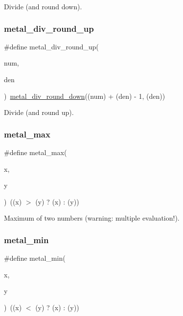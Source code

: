 Divide (and round down). \mbox{\label{group__utilities_gace231318276c47f6e2fbc12e61fd5b7c}} 
\subsubsection{\texorpdfstring{metal\+\_\+div\+\_\+round\+\_\+up}{metal\_div\_round\_up}}
{\footnotesize\ttfamily \#define metal\+\_\+div\+\_\+round\+\_\+up(\begin{DoxyParamCaption}\item[{}]{num,  }\item[{}]{den }\end{DoxyParamCaption})~\hyperlink{group__utilities_ga86077c41e1fb0d755b406d07213aecae}{metal\+\_\+div\+\_\+round\+\_\+down}((num) + (den) -\/ 1, (den))}

Divide (and round up). \mbox{\label{group__utilities_ga4e7658a6bfc47722c6dbf37b2b15278c}} 
\subsubsection{\texorpdfstring{metal\+\_\+max}{metal\_max}}
{\footnotesize\ttfamily \#define metal\+\_\+max(\begin{DoxyParamCaption}\item[{}]{x,  }\item[{}]{y }\end{DoxyParamCaption})~((x) $>$ (y) ? (x) \+: (y))}

Maximum of two numbers (warning\+: multiple evaluation!). \mbox{\label{group__utilities_ga9ea8974801fa4d6b7769097f5da5a68b}} 
\subsubsection{\texorpdfstring{metal\+\_\+min}{metal\_min}}
{\footnotesize\ttfamily \#define metal\+\_\+min(\begin{DoxyParamCaption}\item[{}]{x,  }\item[{}]{y }\end{DoxyParamCaption})~((x) $<$ (y) ? (x) \+: (y))}

